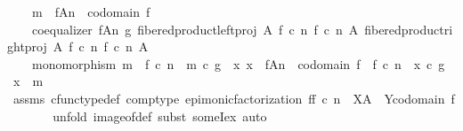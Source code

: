 \begin{isabellebody}
\ \ \ \ m\ {\isacharcolon}{\kern0pt}\ f{\isasymlparr}A{\isasymrparr}\isactrlbsub n\isactrlesub \ {\isasymrightarrow}\ codomain\ f\ {\isasymand}\isanewline
\ \ \ \ coequalizer\ {\isacharparenleft}{\kern0pt}f{\isasymlparr}A{\isasymrparr}\isactrlbsub n\isactrlesub {\isacharparenright}{\kern0pt}\ g\ {\isacharparenleft}{\kern0pt}fibered{\isacharunderscore}{\kern0pt}product{\isacharunderscore}{\kern0pt}left{\isacharunderscore}{\kern0pt}proj\ A\ {\isacharparenleft}{\kern0pt}f\ {\isasymcirc}\isactrlsub c\ n{\isacharparenright}{\kern0pt}\ {\isacharparenleft}{\kern0pt}f\ {\isasymcirc}\isactrlsub c\ n{\isacharparenright}{\kern0pt}\ A{\isacharparenright}{\kern0pt}\ {\isacharparenleft}{\kern0pt}fibered{\isacharunderscore}{\kern0pt}product{\isacharunderscore}{\kern0pt}right{\isacharunderscore}{\kern0pt}proj\ A\ {\isacharparenleft}{\kern0pt}f\ {\isasymcirc}\isactrlsub c\ n{\isacharparenright}{\kern0pt}\ {\isacharparenleft}{\kern0pt}f\ {\isasymcirc}\isactrlsub c\ n{\isacharparenright}{\kern0pt}\ A{\isacharparenright}{\kern0pt}\ {\isasymand}\isanewline
\ \ \ \ monomorphism\ m\ {\isasymand}\ f\ {\isasymcirc}\isactrlsub c\ n\ {\isacharequal}{\kern0pt}\ m\ {\isasymcirc}\isactrlsub c\ g\ {\isasymand}\ {\isacharparenleft}{\kern0pt}{\isasymforall}x{\isachardot}{\kern0pt}\ x\ {\isacharcolon}{\kern0pt}\ f{\isasymlparr}A{\isasymrparr}\isactrlbsub n\isactrlesub \ {\isasymrightarrow}\ codomain\ f\ {\isasymlongrightarrow}\ f\ {\isasymcirc}\isactrlsub c\ n\ {\isacharequal}{\kern0pt}\ x\ {\isasymcirc}\isactrlsub c\ g\ {\isasymlongrightarrow}\ x\ {\isacharequal}{\kern0pt}\ m{\isacharparenright}{\kern0pt}{\isachardoublequoteclose}\isanewline
\ \ \ \ \isamarkupfalse%
\ assms\ cfunc{\isacharunderscore}{\kern0pt}type{\isacharunderscore}{\kern0pt}def\ comp{\isacharunderscore}{\kern0pt}type\ epi{\isacharunderscore}{\kern0pt}monic{\isacharunderscore}{\kern0pt}factorization{\isacharbrackleft}{\kern0pt}\ f{\isacharequal}{\kern0pt}{\isachardoublequoteopen}f\ {\isasymcirc}\isactrlsub c\ n{\isachardoublequoteclose}{\isacharcomma}{\kern0pt}\ \ X{\isacharequal}{\kern0pt}A{\isacharcomma}{\kern0pt}\ \ Y{\isacharequal}{\kern0pt}{\isachardoublequoteopen}codomain\ f{\isachardoublequoteclose}{\isacharbrackright}{\kern0pt}\ \isanewline
\ \ \ \ \isamarkupfalse%
\ {\isacharparenleft}{\kern0pt}unfold\ image{\isacharunderscore}{\kern0pt}of{\isacharunderscore}{\kern0pt}def{\isacharcomma}{\kern0pt}\ subst\ someI{\isacharunderscore}{\kern0pt}ex{\isacharcomma}{\kern0pt}\ auto{\isacharparenright}{\kern0pt}\isanewline
\ \ \isamarkupfalse%

\end{isabellebody}
